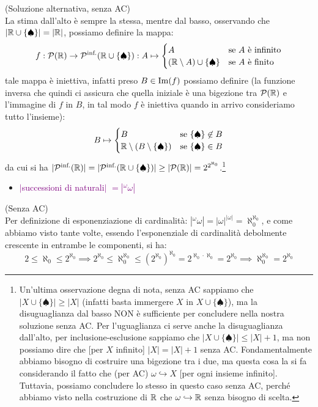 \begin{soln}
	(Soluzione alternativa, senza AC)\\
	La stima dall'alto \`e sempre la stessa, mentre dal basso, osservando che $|\mathbb R \cup \{\spadesuit\}| = |\mathbb R|$, possiamo definire la mappa:
	\[ f : \mathcal{P}(\mathbb R) \to \mathcal{P}^{\text{inf.}}(\mathbb R \cup \{\spadesuit\}) : A \mapsto \begin{cases}
		A &\text{se $A$ \`e infinito} \\
		(\mathbb R \setminus A) \cup \{\spadesuit\} &\text{se $A$ \`e finito}
	\end{cases}
		\]
	tale mappa \`e iniettiva, infatti preso $B \in \operatorname{Im}(f)$ possiamo definire (la funzione inversa che quindi ci assicura che quella iniziale \`e una bigezione tra $\mathcal{P}(\mathbb R)$ e l'immagine di $f$ in $B$, in tal modo $f$ \`e iniettiva quando in arrivo consideriamo tutto l'insieme):
	\[ B \mapsto \begin{cases}
		B &\text{se $\{\spadesuit\} \not \in B$} \\
		\mathbb R \setminus (B \setminus \{\spadesuit\}) &\text{se $\{\spadesuit\} \in B$}
	\end{cases}
		\]
	da cui si ha $|\mathcal{P}^{\text{inf.}}(\mathbb R)| = |\mathcal{P}^{\text{inf.}}(\mathbb R \cup \{\spadesuit\})| \geq |\mathcal{P}(\mathbb R)| = 2^{2^{\aleph_0}}$.\footnote{Un'ultima osservazione degna di nota, senza AC sappiamo che $|X \cup \{\spadesuit\}| \geq |X|$ (infatti basta immergere $X$ in $X \cup \{\spadesuit\}$), ma la disuguaglianza dal basso NON \`e sufficiente per concludere nella nostra soluzione senza AC.
	Per l'uguaglianza ci serve anche la disuguaglianza dall'alto, per inclusione-esclusione sappiamo che $|X \cup \{\spadesuit\}| \leq |X| + 1$, ma non possiamo dire che [per $X$ infinito] $|X| = |X| + 1$ senza AC. Fondamentalmente abbiamo bisogno di costruire una bigezione tra i due, ma questa cosa la si fa considerando il fatto che (per AC) $\omega \hookrightarrow X$ [per ogni insieme infinito]. Tuttavia, possiamo concludere lo stesso in questo caso senza AC, perch\'e abbiamo visto nella costruzione di $\mathbb R$ che $\omega \hookrightarrow \mathbb R$ senza bisogno di scelta.}
\end{soln}

\begin{itemize}
	\item \textcolor{purple}{$|$successioni di naturali$|$ $= |{}^\omega \omega|$}
\end{itemize}

\begin{soln}
	(Senza AC)\\
	Per definizione di esponenziazione di cardinalit\`a: $|{}^\omega \omega| = |\omega|^{|\omega|} = \aleph_0^{\aleph_0}$, e come abbiamo visto tante volte, essendo l'esponenziale di cardinalit\`a debolmente crescente in entrambe le componenti, si ha:
	\[ 2 \leq \aleph_0 \leq 2^{\aleph_0} \implies 2^{\aleph_0} \leq \aleph_0^{\aleph_0} \leq (2^{\aleph_0})^{\aleph_0} = 2^{\aleph_0 \cdot \aleph_0} = 2^{\aleph_0} \implies \aleph_0^{\aleph_0} = 2^{\aleph_0}
		\]
\end{soln}

